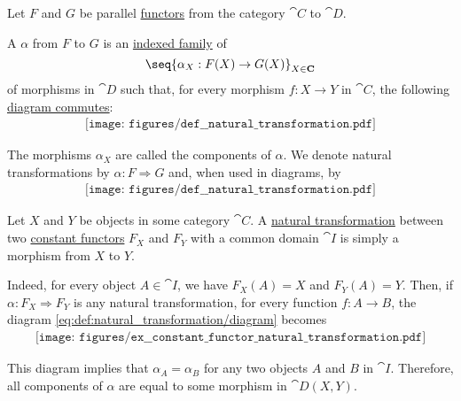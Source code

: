 \begin{definition}\label{def:natural_transformation}
  Let \( F \) and \( G \) be parallel \hyperref[def:functor]{functors} from the category \( \cat{C} \) to \( \cat{D} \).

  A  \( \alpha \) from \( F \) to \( G \) is an \hyperref[def:tuple_and_cartesian_product/indexed_family]{indexed family} of
  \begin{equation}\label{eq:def:natural_transformation/family}
    \seq{ \alpha_X: F(X) \to G(X) }_{X \in \cat{C}}
  \end{equation}
  of morphisms in \( \cat{D} \) such that, for every morphism \( f: X \to Y \) in \( \cat{C} \), the following \hyperref[def:categorical_diagram]{diagram commutes}:
  \begin{equation}\label{eq:def:natural_transformation/diagram}
    \begin{aligned}
      \texttt{[image: figures/def\_\_natural\_transformation.pdf]}
    \end{aligned}
  \end{equation}

  The morphisms \( \alpha_X \) are called the components of \( \alpha \). We denote natural transformations by \( \alpha: F \Rightarrow G \) and, when used in diagrams, by
  \begin{equation}\label{eq:def:natural_transformation/notation}
    \begin{aligned}
      \texttt{[image: figures/def\_\_natural\_transformation.pdf]}
    \end{aligned}
  \end{equation}
\end{definition}

\begin{example}\label{ex:constant_functor_natural_transformation}
  Let \( X \) and \( Y \) be objects in some category \( \cat{C} \). A \hyperref[def:natural_transformation]{natural transformation} between two \hyperref[ex:constant_functor]{constant functors} \( F_X \) and \( F_Y \) with a common domain \( \cat{I} \) is simply a morphism from \( X \) to \( Y \).

  Indeed, for every object \( A \in \cat{I} \), we have \( F_X(A) = X \) and \( F_Y(A) = Y \). Then, if \( \alpha: F_X \Rightarrow F_Y \) is any natural transformation, for every function \( f: A \to B \), the diagram \eqref{eq:def:natural_transformation/diagram} becomes
  \begin{equation}\label{eq:ex:constant_functor_natural_transformation}
    \begin{aligned}
      \texttt{[image: figures/ex\_\_constant\_functor\_natural\_transformation.pdf]}
    \end{aligned}
  \end{equation}

  This diagram implies that \( \alpha_A = \alpha_B \) for any two objects \( A \) and \( B \) in \( \cat{I} \). Therefore, all components of \( \alpha \) are equal to some morphism in \( \cat{D}(X, Y) \).
\end{example}

